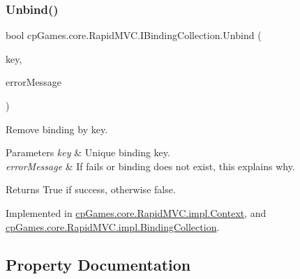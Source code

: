 \mbox{\label{interfacecp_games_1_1core_1_1_rapid_m_v_c_1_1_i_binding_collection_ab20c12c64a91e24e7685780dd64f1d87}} 
\subsubsection{\texorpdfstring{Unbind()}{Unbind()}}
{\footnotesize\ttfamily bool cp\+Games.\+core.\+Rapid\+M\+V\+C.\+I\+Binding\+Collection.\+Unbind (\begin{DoxyParamCaption}\item[{\mbox{\hyperlink{interfacecp_games_1_1core_1_1_rapid_m_v_c_1_1_i_binding_key}{I\+Binding\+Key}}}]{key,  }\item[{out string}]{error\+Message }\end{DoxyParamCaption})}



Remove binding by key. 


\begin{DoxyParams}{Parameters}
{\em key} & Unique binding key.\\
\hline
{\em error\+Message} & If fails or binding does not exist, this explains why.\\
\hline
\end{DoxyParams}
\begin{DoxyReturn}{Returns}
True if success, otherwise false.
\end{DoxyReturn}


Implemented in \mbox{\hyperlink{classcp_games_1_1core_1_1_rapid_m_v_c_1_1impl_1_1_context_a7cf9cfaa3957b4e48fdaccd726cbd8aa}{cp\+Games.\+core.\+Rapid\+M\+V\+C.\+impl.\+Context}}, and \mbox{\hyperlink{classcp_games_1_1core_1_1_rapid_m_v_c_1_1impl_1_1_binding_collection_a86fc516a730e0862d18c5a9cfb561f3c}{cp\+Games.\+core.\+Rapid\+M\+V\+C.\+impl.\+Binding\+Collection}}.



\subsection{Property Documentation}
\mbox{\label{interfacecp_games_1_1core_1_1_rapid_m_v_c_1_1_i_binding_collection_ae64df704d272c94fcb9fb16e896bc66b}} 
